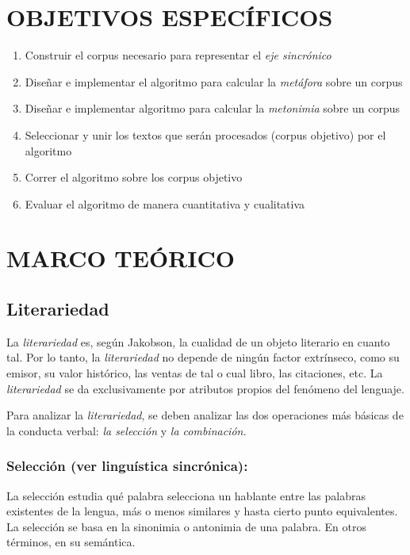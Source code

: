 \documentclass[twoside]{article}
\begin{document}
\section{OBJETIVOS ESPECÍFICOS}
\label{sec:org410e06c}

\begin{enumerate}
\item Construir el corpus necesario para representar el \emph{eje sincrónico}
\item Diseñar e implementar el algoritmo para calcular la \emph{metáfora} sobre un corpus
\item Diseñar e implementar algoritmo para calcular la \emph{metonimia} sobre un corpus
\item Seleccionar y unir los textos que serán procesados (corpus objetivo) por el algoritmo
\item Correr el algoritmo sobre los corpus objetivo
\item Evaluar el algoritmo de manera cuantitativa y cualitativa
\end{enumerate}

\section{MARCO TEÓRICO}
\label{sec:org56427ca}

\subsection{Literariedad}
\label{sec:org724748f}


La \emph{literariedad} es, según Jakobson, la cualidad de un objeto
literario en cuanto tal. Por lo tanto, la \emph{literariedad} no depende de
ningún factor extrínseco, como su emisor, su valor histórico, las
ventas de tal o cual libro, las citaciones, etc. La \emph{literariedad} se
da exclusivamente por atributos propios del fenómeno del lenguaje.

Para analizar la \emph{literariedad}, se deben analizar las dos operaciones
más básicas de la conducta verbal: \emph{la selección} y \emph{la combinación.}


\subsubsection{Selección (ver linguística sincrónica):}
\label{sec:org0fc82e6}

La selección estudia qué palabra selecciona un hablante entre las
palabras existentes de la lengua, más o menos similares y hasta
cierto punto equivalentes. La selección se basa en la sinonimia o
antonimia de una palabra. En otros términos, en su semántica.
\end{document}
